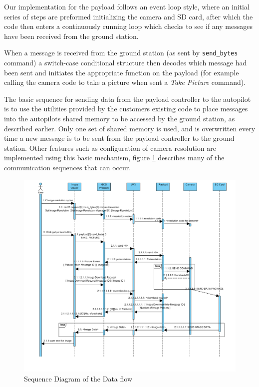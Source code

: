 Our implementation for the payload follows an event loop style, where an initial series of 
steps are preformed initializing the camera and SD card, after which the code then enters a continuously
running loop which checks to see if any messages have been received from the ground station.

When a message is received from the ground station (as sent by \verb+send_bytes+ command) a switch-case
conditional structure then decodes which message had been sent and
initiates the appropriate function on the payload (for example calling the camera code to take a picture when sent
a \emph{Take Picture} command).



The basic sequence for sending data from the payload controller to the autopilot is to use the utilities provided 
by the customers existing code to place messages into the autopilots shared memory to be accessed by the
ground station, as described earlier. Only one set of shared memory is used, and is overwritten every time 
a new message is to be sent from the payload controller to the ground station.
Other features such as configuration of camera resolution are implemented using this basic mechanism, figure \ref{sequence diagram} describes many of the communication sequences that can occur.


\begin{figure}[H]
\begin{center}
\includegraphics[width=1.00\textwidth]{figures/sequence_diagram.png} 
\end{center}
\caption{Sequence Diagram of the Data flow\label{sequence diagram}}
\end{figure}

